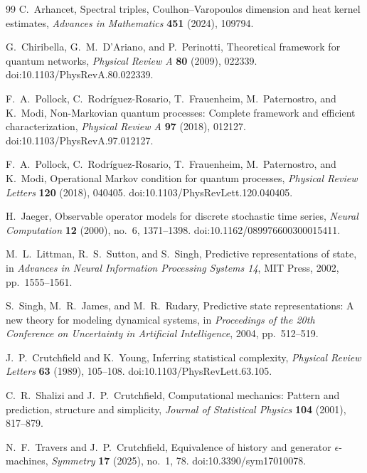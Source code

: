 \documentclass[11pt]{article}
\theoremstyle{definition}
\theoremstyle{remark}
\theoremstyle{definition}
\theoremstyle{remark}
\begin{document}
\begin{thebibliography}{99}
C.~Arhancet,
\newblock Spectral triples, Coulhon--Varopoulos dimension and heat kernel estimates,
\newblock \emph{Advances in Mathematics} \textbf{451} (2024), 109794.

G.~Chiribella, G.~M.~D'Ariano, and P.~Perinotti,
\newblock Theoretical framework for quantum networks,
\newblock \emph{Physical Review A} \textbf{80} (2009), 022339.
\newblock doi:10.1103/PhysRevA.80.022339.

F.~A.~Pollock, C.~Rodr\'iguez-Rosario, T.~Frauenheim, M.~Paternostro, and K.~Modi,
\newblock Non-Markovian quantum processes: Complete framework and efficient
characterization,
\newblock \emph{Physical Review A} \textbf{97} (2018), 012127.
\newblock doi:10.1103/PhysRevA.97.012127.

F.~A.~Pollock, C.~Rodr\'iguez-Rosario, T.~Frauenheim, M.~Paternostro, and K.~Modi,
\newblock Operational Markov condition for quantum processes,
\newblock \emph{Physical Review Letters} \textbf{120} (2018), 040405.
\newblock doi:10.1103/PhysRevLett.120.040405.

H.~Jaeger,
\newblock Observable operator models for discrete stochastic time series,
\newblock \emph{Neural Computation} \textbf{12} (2000), no.~6, 1371--1398.
\newblock doi:10.1162/089976600300015411.

M.~L.~Littman, R.~S.~Sutton, and S.~Singh,
\newblock Predictive representations of state,
\newblock in \emph{Advances in Neural Information Processing Systems 14},
MIT Press, 2002, pp.~1555--1561.

S.~Singh, M.~R.~James, and M.~R.~Rudary,
\newblock Predictive state representations: A new theory for modeling dynamical
systems,
\newblock in \emph{Proceedings of the 20th Conference on Uncertainty in Artificial
Intelligence}, 2004, pp.~512--519.

J.~P.~Crutchfield and K.~Young,
\newblock Inferring statistical complexity,
\newblock \emph{Physical Review Letters} \textbf{63} (1989), 105--108.
\newblock doi:10.1103/PhysRevLett.63.105.

C.~R.~Shalizi and J.~P.~Crutchfield,
\newblock Computational mechanics: Pattern and prediction, structure and simplicity,
\newblock \emph{Journal of Statistical Physics} \textbf{104} (2001), 817--879.

N.~F.~Travers and J.~P.~Crutchfield,
\newblock Equivalence of history and generator $\epsilon$-machines,
\newblock \emph{Symmetry} \textbf{17} (2025), no.~1, 78.
\newblock doi:10.3390/sym17010078.


\end{thebibliography}
\end{document}
